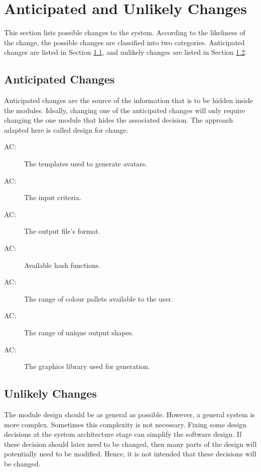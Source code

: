\documentclass[12pt, titlepage]{article}
\newcounter{acnum}
\newcommand{\actheacnum}{AC\theacnum}
\begin{document}
\section{Anticipated and Unlikely Changes} \label{SecChange}

This section lists possible changes to the system. According to the likeliness
of the change, the possible changes are classified into two
categories. Anticipated changes are listed in Section \ref{SecAchange}, and
unlikely changes are listed in Section \ref{SecUchange}.

\subsection{Anticipated Changes} \label{SecAchange}

Anticipated changes are the source of the information that is to be hidden
inside the modules. Ideally, changing one of the anticipated changes will only
require changing the one module that hides the associated decision. The approach
adapted here is called design for
change.

\begin{description}
\item[ \actheacnum \label{acTemplate}:] The templates used to generate avatars.
\item[ \actheacnum \label{acInput}:] The input criteria.
\item[ \actheacnum \label{acFormat}:] The output file's format.
\item[ \actheacnum \label{acHash}:] Available hash functions.
\item[ \actheacnum \label{acColour}:] The range of colour pallets available to the user.
\item[ \actheacnum \label{acOutputShape}:] The range of unique output shapes.
\item[ \actheacnum \label{acInput}:] The graphics library used for generation.
\end{description}

\subsection{Unlikely Changes} \label{SecUchange}

The module design should be as general as possible. However, a general system is
more complex. Sometimes this complexity is not necessary. Fixing some design
decisions at the system architecture stage can simplify the software design. If
these decision should later need to be changed, then many parts of the design
will potentially need to be modified. Hence, it is not intended that these
decisions will be changed.
\end{document}
